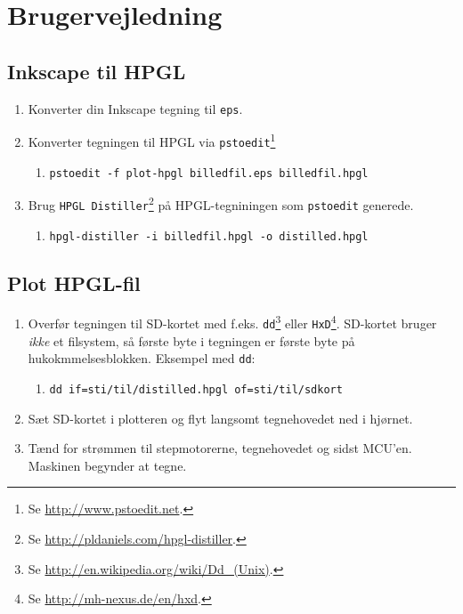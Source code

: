 \chapter{Brugervejledning}
\label{ch:brugervejledning}



\section{Inkscape til HPGL}

\begin{enumerate} \firmlist
\item Konverter din Inkscape tegning til \texttt{eps}.
\item Konverter tegningen til HPGL via \texttt{pstoedit}\footnote{Se \url{http://www.pstoedit.net}.} 
  \begin{enumerate}[-]
  \item \texttt{pstoedit -f plot-hpgl billedfil.eps billedfil.hpgl}
  \end{enumerate}
\item Brug \texttt{HPGL Distiller}\footnote{Se
    \url{http://pldaniels.com/hpgl-distiller}.} på HPGL-tegniningen
  som \texttt{pstoedit} generede.
  \begin{enumerate}[-]
  \item \texttt{hpgl-distiller -i billedfil.hpgl -o distilled.hpgl}
  \end{enumerate}
\end{enumerate}


\section{Plot HPGL-fil}

\begin{enumerate} \firmlist

\item Overfør tegningen til SD-kortet med
  f.eks. \texttt{dd}\footnote{Se
    \url{http://en.wikipedia.org/wiki/Dd_(Unix)}.} eller
  \texttt{HxD}\footnote{Se
    \url{http://mh-nexus.de/en/hxd}.}. SD-kortet bruger \textit{ikke}
  et filsystem, så første byte i tegningen er første byte på
  hukokmmelsesblokken. Eksempel med \texttt{dd}:
  \begin{enumerate}[-]
  \item \texttt{dd if=sti/til/distilled.hpgl of=sti/til/sdkort}
  \end{enumerate}
\item Sæt SD-kortet i plotteren og flyt langsomt tegnehovedet ned i
  hjørnet.
\item Tænd for strømmen til stepmotorerne, tegnehovedet og sidst
  MCU'en. Maskinen begynder at tegne.
\end{enumerate}


